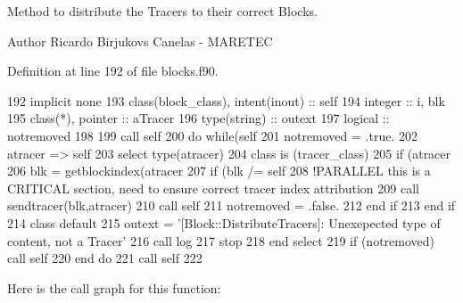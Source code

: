 Method to distribute the Tracers to their correct Blocks. 

\begin{DoxyAuthor}{Author}
Ricardo Birjukovs Canelas -\/ M\+A\+R\+E\+T\+EC 
\end{DoxyAuthor}


Definition at line 192 of file blocks.\+f90.


\begin{DoxyCode}
192     \textcolor{keywordtype}{implicit none}
193     \textcolor{keywordtype}{class}(block\_class), \textcolor{keywordtype}{intent(inout)} :: self
194     \textcolor{keywordtype}{integer} :: i, blk
195     \textcolor{keywordtype}{class}(*), \textcolor{keywordtype}{pointer} :: aTracer
196     \textcolor{keywordtype}{type}(string) :: outext
197     \textcolor{keywordtype}{logical} :: notremoved
198 
199     \textcolor{keyword}{call }self%
200     \textcolor{keywordflow}{do} \textcolor{keywordflow}{while}(self%
201         notremoved = .true.
202         atracer => self%
203         \textcolor{keywordflow}{select type}(atracer)
204 \textcolor{keywordflow}{        class is} (tracer\_class)
205             \textcolor{keywordflow}{if} (atracer%
206                 blk = getblockindex(atracer%
207                 \textcolor{keywordflow}{if} (blk /= self%
208                     \textcolor{comment}{!PARALLEL this is a CRITICAL section, need to ensure correct tracer index attribution}
209                     \textcolor{keyword}{call }sendtracer(blk,atracer)
210                     \textcolor{keyword}{call }self%
211                     notremoved = .false.
212 \textcolor{keywordflow}{                end if}
213 \textcolor{keywordflow}{            end if}
214 \textcolor{keywordflow}{            class default}
215             outext = \textcolor{stringliteral}{'[Block::DistributeTracers]: Unexepected type of content, not a Tracer'}
216             \textcolor{keyword}{call }log%
217             stop
218 \textcolor{keywordflow}{        end select}
219         \textcolor{keywordflow}{if} (notremoved) \textcolor{keyword}{call }self%
220 \textcolor{keywordflow}{    end do}
221     \textcolor{keyword}{call }self%
222 
\end{DoxyCode}
Here is the call graph for this function\+:
\mbox{\label{namespaceblocks__mod_a62e8fb0d6b2535b4499c7a4d848c24ba}} 
